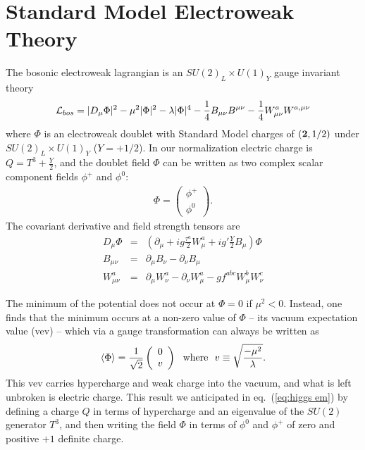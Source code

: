 \documentclass[12pt]{article}
\def\beq{\begin{eqnarray}}
\def\eeq{\end{eqnarray}}
\def\bea{\begin{eqnarray}}
\def\eea{\end{eqnarray}}
\def\xsection#1{\section{#1}}
\def\eq#1{eq.~(\ref{#1})}
\begin{document}
\xsection{Standard Model Electroweak Theory}

The bosonic electroweak lagrangian is an $SU(2)_L\times U(1)_Y$ gauge invariant theory
\beq
{\cal L}_{bos}=|D_\mu \Phi |^2-\mu^2|\Phi |^2-\lambda |\Phi |^4-\frac{1}{4}B_{\mu\nu}B^{\mu\nu}
-\frac{1}{4}W^a_{\mu\nu}W^{a,\mu\nu}
\eeq
where $\Phi$ is an electroweak doublet with Standard Model charges of $({\bf 2},1/2)$ under $SU(2)_L\times U(1)_Y$ ($Y=+1/2$). In our normalization electric charge is $Q=T^3+\frac{Y}{2}$, and the doublet field $\Phi$ can be written as two complex scalar component fields $\phi^+$ and $\phi^0$:
\beq
\Phi=\left( \begin{array}{c} \phi^+ \\ \phi^0\end{array}\right).
\label{eq:higgs em}
\eeq
The covariant derivative and field strength tensors are
\bea
D_\mu \Phi & = &\left( \partial_\mu+ig\frac{\tau^a}{2}W^{a}_{\mu}+ig'\frac{Y}{2}B_\mu\right) \Phi \\
B_{\mu\nu}&=&\partial_\mu B_\nu-\partial_\nu B_\mu \\
W^a_{\mu\nu} & = & \partial_\mu W^a_\nu-\partial_\nu W^a_\mu-g f^{abc}W^b_\mu W^c_\nu
\eea

The minimum of the potential does not occur at $\Phi=0$ if $\mu^2<0$. Instead, one finds that the minimum occurs at a non-zero value of $\Phi$ -- its vacuum expectation value (vev) -- which via a gauge transformation can always be written as
\beq
\langle \Phi\rangle =\frac{1}{\sqrt{2}}\left( \begin{array}{c} 0 \\ v \end{array}\right)~~{\rm where}~~
v\equiv \sqrt{\frac{-\mu^2}{\lambda}}.
\eeq
This vev carries hypercharge and weak charge into the vacuum, and what is left unbroken is electric charge. This result we anticipated in \eq{eq:higgs em} by defining a charge $Q$ in terms of hypercharge and an eigenvalue of the $SU(2)$ generator $T^3$, and then writing the field $\Phi$ in terms of $\phi^0$ and $\phi^+$ of zero and positive $+1$ definite charge. 
\end{document}
